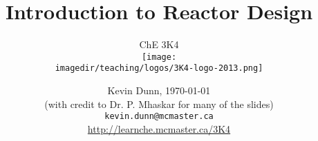 \documentclass[handout, 14pt]{beamer}
\title[]{\large Introduction to Reactor Design}
\subtitle[]{\large ChE 3K4\\\vspace{0.5cm}\texttt{[image: \\imagedir/teaching/logos/3K4-logo-2013.png]}\vspace{-1.5cm} }
\author[]{}
\institute[]{}
\date[]{Kevin Dunn, \today \\  {\footnotesize (with credit to Dr. P. Mhaskar for many of the slides)} \\ \vspace{0.5cm} {\footnotesize {\tt kevin.dunn@mcmaster.ca}\\
\href{http://learnche.mcmaster.ca/3K4}{http://learnche.mcmaster.ca/3K4}\\} \vspace{0.5cm}{\footnotesize Overall revision number: \hgversion (\monthname~\THEYEAR)} %
}
\begin{document}
	
\begin{frame} \titlepage \end{frame}


\end{document}
